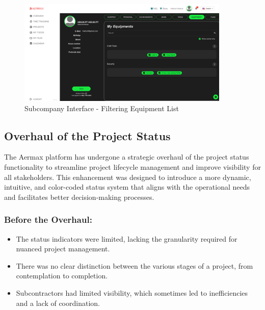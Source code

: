 \begin{figure}[H]
    \centering
    \includegraphics[width=0.9\textwidth]{src/assets/images/Interface2.png}
    \caption{Subcompany Interface - Filtering Equipment List}
    \label{fig:subcompany_interface_2}
\end{figure}


\subsection{Overhaul of the Project Status}

The Aermax platform has undergone a strategic overhaul of the project status functionality to streamline project lifecycle management and improve visibility for all stakeholders. This enhancement was designed to introduce a more dynamic, intuitive, and color-coded status system that aligns with the operational needs and facilitates better decision-making processes.

\subsubsection{Before the Overhaul:}
\begin{itemize}
    \item The status indicators were limited, lacking the granularity required for nuanced project management.
    \item There was no clear distinction between the various stages of a project, from contemplation to completion.
    \item Subcontractors had limited visibility, which sometimes led to inefficiencies and a lack of coordination.
\end{itemize}


